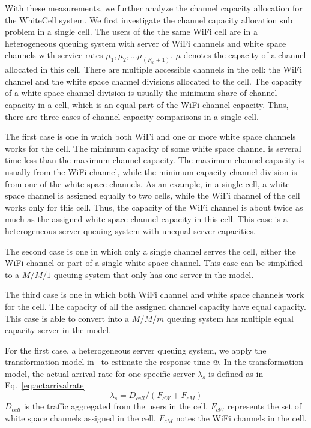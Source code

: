 With these measurements, we further analyze the channel capacity allocation for 
the WhiteCell system. 
We first investigate the channel capacity allocation sub problem in a single cell.
The users of the the same WiFi cell are in a heterogeneous queuing system with server of 
WiFi channels and white space channels with service rates $\mu_1,\mu_2,...\mu_{(F_w+1)}$.
$\mu$ denotes the capacity of a channel allocated in this cell.
There are multiple accessible channels in the cell: the WiFi channel and the 
white space channel divisions allocated to the cell.
The capacity of a white space channel division is usually 
the minimum share of channel capacity in a cell, which is an equal part of the WiFi channel capacity.
Thus, there are three cases of channel capacity comparisons in a single cell. 

The first case is one in which both WiFi and one or more white space channels works for the cell. 
The minimum capacity of some white space channel is several time less than the maximum channel 
capacity. The maximum channel capacity is usually from the WiFi channel, while the minimum capacity channel 
division is from one of the white space channels. 
As an example, in a single cell, a white space channel is assigned equally to two cells, while 
the WiFi channel of the cell works only for this cell. Thus, the capacity of the WiFi channel is 
about twice as much as the assigned white space channel capacity in this cell.
This case is a heterogeneous server queuing system with unequal server capacities.

The second case is one in which only a single channel serves the cell, either the WiFi channel or 
part of a single white space channel.
This case can be simplified to a $M/M/1$ queuing system that only has one server in the model.

The third case is one in which both WiFi channel and white space channels work for the cell. 
The capacity of all the assigned channel capacity have equal capacity.
This case is able to convert into a $M/M/m$ queuing system has multiple equal capacity server in the model.

For the first case, a heterogeneous server queuing system, we apply the transformation model 
in~\cite{yu2008transformation} to estimate the response time $\bar{w}$. 
In the transformation model, the actual arrival rate for one specific server $\lambda_s$ is 
defined as in Eq.~\ref{eq:actarrivalrate}
\begin{equation}
\label{eq:actarrivalrate}
\lambda_s=D_{cell}/(F_{cW}+F_{cM})
\end{equation}
$D_{cell}$ is the traffic aggregated from the users in the cell.
$F_{cW}$ represents the set of white space channels assigned in the cell, $F_{cM}$ notes the WiFi channels 
in the cell.


